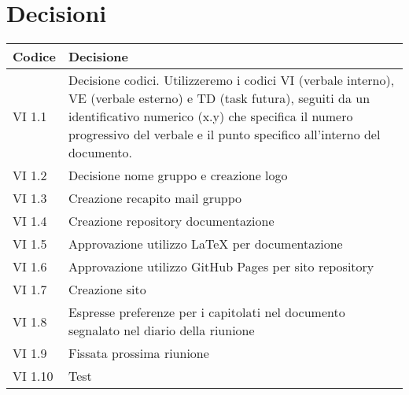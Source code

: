 \section{Decisioni}

	\begin{table}[htbp]
		\begin{tabular}{|p{}|p{}|}
			\hline
			\rowcolor[gray]{0.9}
			Codice & Decisione \\
			\hline
			VI 1.1 & Decisione codici. Utilizzeremo i codici VI (verbale interno), VE (verbale esterno) e TD (task futura), seguiti da un identificativo numerico (x.y) che specifica il numero progressivo del verbale e il punto specifico all'interno del documento. \\
			\hline
			VI 1.2	& Decisione nome gruppo e creazione logo \\
			\hline
			VI 1.3 & Creazione recapito mail gruppo \\
			\hline
			VI 1.4 & Creazione repository documentazione \\
			\hline
			VI 1.5	& Approvazione utilizzo LaTeX per documentazione \\
			\hline
			VI 1.6 & Approvazione utilizzo GitHub Pages per sito repository \\
			\hline
			VI 1.7 & Creazione sito \\
			\hline
			VI 1.8 & Espresse preferenze per i capitolati nel documento segnalato nel diario della riunione \\
			\hline
			VI 1.9 & Fissata prossima riunione \\
			\hline
			VI 1.10 & Test \\
			\hline
		\end{tabular}
	\end{table}